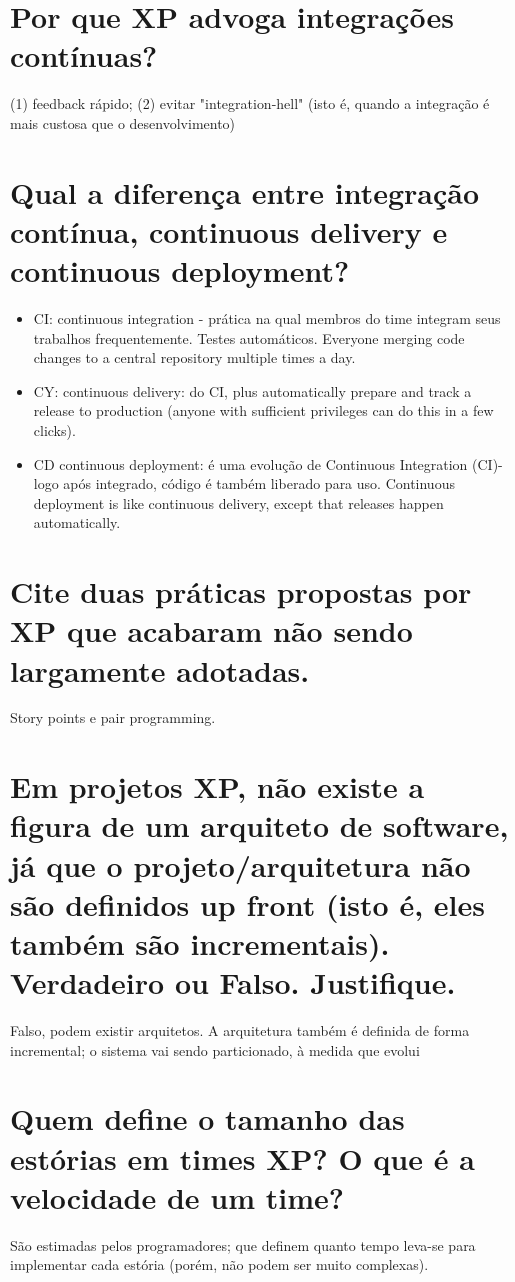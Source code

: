 \documentclass[11pt]{article}
\begin{document}
\section{Por que XP advoga integrações contínuas?}
\label{sec:org2a830a4}
(1) feedback rápido; (2) evitar "integration-hell" (isto é, quando a integração é mais
custosa que o desenvolvimento)

\section{Qual a diferença entre integração contínua, continuous delivery e continuous deployment?}
\label{sec:orge1498b9}
\begin{itemize}
\item CI: continuous integration - prática na qual membros do time integram seus trabalhos
frequentemente. Testes automáticos. Everyone merging code changes to a central
repository multiple times a day.
\item CY: continuous delivery: do CI, plus automatically prepare and track a release to
production (anyone with sufficient privileges can do this in a few clicks).
\item CD continuous deployment: é uma evolução de Continuous Integration (CI)- logo após
integrado, código é também liberado para uso. Continuous deployment is like continuous
delivery, except that releases happen automatically.
\end{itemize}

\section{Cite duas práticas propostas por XP que acabaram não sendo largamente adotadas.}
\label{sec:org4114a37}
Story points e pair programming.

\section{Em projetos XP, não existe a figura de um arquiteto de software, já que o projeto/arquitetura não são definidos up front (isto é, eles também são incrementais). Verdadeiro ou Falso. Justifique.}
\label{sec:orgc5109fb}
Falso, podem existir arquitetos. A arquitetura também é definida de forma incremental; o
sistema vai sendo particionado, à medida que evolui


\section{Quem define o tamanho das estórias em times XP? O que é a velocidade de um time?}
\label{sec:org8581110}
São estimadas pelos programadores; que definem quanto tempo leva-se para implementar
cada estória (porém, não podem ser muito complexas). 
\end{document}
